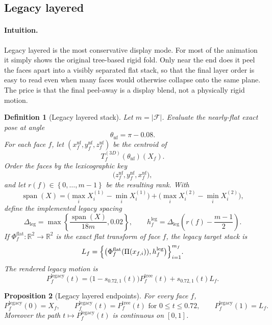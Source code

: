 \documentclass[11pt]{article}
\newtheorem{definition}{Definition}[section]
\newtheorem{proposition}[definition]{Proposition}
\theoremstyle{remark}
\newcommand{\RR}{\mathbb{R}}
\newcommand{\abs}[1]{\left\lvert #1 \right\rvert}
\newcommand{\set}[1]{\left\{ #1 \right\}}
\begin{document}
\subsection*{Legacy layered}

\paragraph{Intuition.}
Legacy layered is the most conservative display mode. For most of the animation
it simply shows the original tree-based rigid fold. Only near the end does it
peel the faces apart into a visibly separated flat stack, so that the final
layer order is easy to read even when many faces would otherwise collapse onto
the same plane. The price is that the final peel-away is a display blend, not a
physically rigid motion.

\begin{definition}[Legacy layered stack]
Let $m=\abs{\mathcal F}$. Evaluate the nearly-flat exact pose at angle
\[
\theta_{\mathrm{nf}}=\pi-0.08.
\]
For each face $f$, let $(x_f^{\mathrm{nf}},y_f^{\mathrm{nf}},z_f^{\mathrm{nf}})$
be the centroid of
\[
T_f^{(3D)}(\theta_{\mathrm{nf}})(X_f).
\]
Order the
faces by the lexicographic key
\[
\bigl(z_f^{\mathrm{nf}},y_f^{\mathrm{nf}},x_f^{\mathrm{nf}}\bigr),
\]
and let $r(f)\in\set{0,\dots,m-1}$ be the resulting rank. With
\[
\operatorname{span}(X)
=
\bigl(\max_i X_i^{(1)}-\min_i X_i^{(1)}\bigr)
+
\bigl(\max_i X_i^{(2)}-\min_i X_i^{(2)}\bigr),
\]
define the implemented legacy spacing
\[
\Delta_{\mathrm{leg}}
=
\max\left\{
\frac{\operatorname{span}(X)}{18m},
0.02
\right\},
\qquad
h_f^{\mathrm{leg}}
=
\Delta_{\mathrm{leg}}
\left(r(f)-\frac{m-1}{2}\right).
\]
If $\Phi_f^{\mathrm{flat}}:\RR^2\to\RR^2$ is the exact flat transform of face
$f$, the legacy target stack is
\[
L_f
=
\Bigl\{
\bigl(\Phi_f^{\mathrm{flat}}(\Pi(x_{f,i})),h_f^{\mathrm{leg}}\bigr)
\Bigr\}_{i=1}^{m_f}.
\]
The rendered legacy motion is
\[
P_f^{\mathrm{legacy}}(t)
=
\bigl(1-s_{0.72,1}(t)\bigr)P_f^{\mathrm{tree}}(t)
+
s_{0.72,1}(t)L_f.
\]
\end{definition}

\begin{proposition}[Legacy layered endpoints]
For every face $f$,
\[
P_f^{\mathrm{legacy}}(0)=X_f,
\qquad
P_f^{\mathrm{legacy}}(t)=P_f^{\mathrm{tree}}(t)
\text{ for }0\le t\le 0.72,
\qquad
P_f^{\mathrm{legacy}}(1)=L_f.
\]
Moreover the path $t\mapsto P_f^{\mathrm{legacy}}(t)$ is continuous on
$[0,1]$.
\end{proposition}
\end{document}
